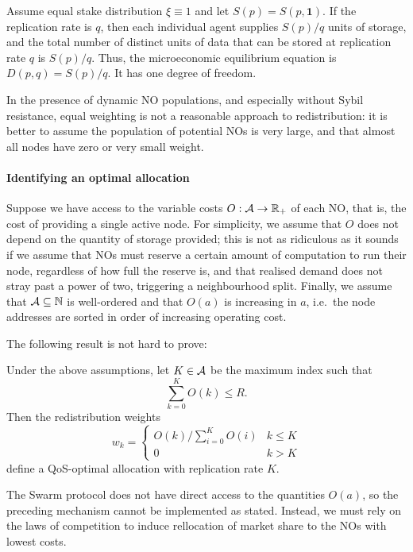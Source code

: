 \begin{example}

  Assume equal stake distribution $\xi \equiv 1$ and let $S(p)=S(p,\mathbf{1})$.
  If the replication rate is $q$, then each individual agent supplies $S(p)/q$ units of storage, and the total number of distinct units of data that can be stored at replication rate $q$ is $S(p)/q$.
  Thus, the microeconomic equilibrium equation is $D(p,q)=S(p)/q$.
  It has one degree of freedom.

  In the presence of dynamic NO populations, and especially without Sybil resistance, equal weighting is not a reasonable approach to redistribution: it is better to assume the population of potential NOs is very large, and that almost all nodes have zero or very small weight.

\end{example}

\paragraph{Identifying an optimal allocation}
Suppose we have access to the variable costs $O:\mathcal{A}\rightarrow\mathbb{R}_+$ of each NO, that is, the cost of providing a single active node.
%
For simplicity, we assume that $O$ does not depend on the quantity of storage provided; this is not as ridiculous as it sounds if we assume that NOs must reserve a certain amount of computation to run their node, regardless of how full the reserve is, and that realised demand does not stray past a power of two, triggering a neighbourhood split.
%
Finally, we assume that $\mathcal{A}\subseteq\mathbb{N}$ is well-ordered and that $O(a)$ is increasing in $a$, i.e.~the node addresses are sorted in order of increasing operating cost.

The following result is not hard to prove:
%
\begin{proposition*}
  Under the above assumptions, let $K\in\mathcal{A}$ be the maximum index such that
  \[
    \sum_{k=0}^KO(k) \leq R.
  \]
  Then the redistribution weights
  \[
    w_k = \left\{ \begin{array}{ll}
      O(k)/\sum_{i=0}^KO(i) & k\leq K \\
      0 & k > K
    \end{array} \right.
  \]
  define a QoS-optimal allocation with replication rate $K$.
\end{proposition*}

The Swarm protocol does not have direct access to the quantities $O(a)$, so the preceding mechanism cannot be implemented as stated.
%
Instead, we must rely on the laws of competition to induce rellocation of market share to the NOs with lowest costs.

